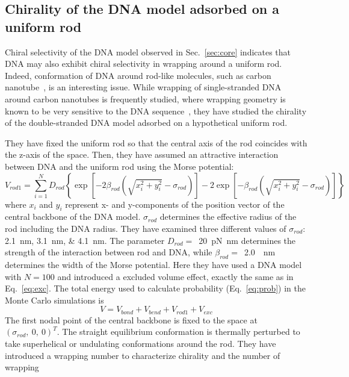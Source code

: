 \documentclass[a4paper,10pt]{article}
\begin{document}
\subsection{Chirality of the DNA model adsorbed on a uniform rod}\label{sec:rod}
Chiral selectivity of the DNA model observed in Sec.~\ref{sec:core} indicates that DNA may also exhibit chiral selectivity in wrapping around a uniform rod.
Indeed, conformation of DNA around rod-like molecules, such as carbon nanotube~\cite{rod_2}, is an interesting issue.
While wrapping of single-stranded DNA around carbon nanotubes is frequently studied, where wrapping geometry is known to be very sensitive to the DNA sequence~\cite{rod_1}, they have studied the chirality of the double-stranded DNA model adsorbed on a hypothetical uniform rod.

They have fixed the uniform rod so that the central axis of the rod coincides with the z-axis of the space.
Then, they have assumed an attractive interaction between DNA and the uniform rod using the Morse potential:
\begin{equation}\label{eq:rod_1}
V_{rod 1}=\sum_{i=1}^{N}D_{rod}\left\{\exp\left[-2\beta_{rod}\left(\sqrt{x_{i}^{2}+y_{i}^{2}}-\sigma_{rod}\right)\right]-2\exp\left[-\beta_{rod}\left(\sqrt{x_{i}^{2}+y_{i}^{2}}-\sigma_{rod}\right)\right]\right\}
\end{equation}
where $x_{i}$ and $y_{i}$ represent x- and y-components of the position vector of the central backbone of the DNA model.
$\sigma_{rod}$ determines the effective radius of the rod including the DNA radius.
They have examined three different values of $\sigma_{rod}$: \SIlist{2.1;3.1;4.1}{\nm}.
The parameter $D_{rod}=$~\SI{20}{\pico\newton\nano\meter} determines the strength of the interaction between rod and DNA, while $\beta_{rod}=$~\SI{2.0}{\per\nm} determines the width of the Morse potential.
Here they have used a DNA model with $N=100$ and introduced a excluded volume effect, exactly the same as in Eq.~\ref{eq:exc}.
The total energy used to calculate probability (Eq.~\ref{eq:prob}) in the Monte Carlo simulations is
\begin{equation}\label{eq:rod_1_energy}
V=V_{bond}+V_{bend}+V_{rod 1}+V_{exc}
\end{equation}
The first nodal point of the central backbone is fixed to the space at $\left(\sigma_{rod},\ 0,\ 0\right )^T$.
The straight equilibrium conformation is thermally perturbed to take superhelical or undulating conformations around the rod.
They have introduced a wrapping number to characterize chirality and the number of wrapping
\end{document}
